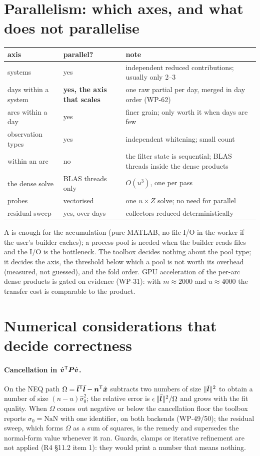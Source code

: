 \section{Parallelism: which axes, and what does not parallelise}
\label{sec:parallel}

\begin{tabular}{@{}P{30mm}P{34mm}P{92mm}@{}}
\toprule
axis & parallel? & note\\
\midrule
systems & yes & independent reduced contributions; usually only 2--3\\
days within a system & \textbf{yes, the axis that scales} & one raw partial per day, merged in day order (WP-62)\\
arcs within a day & yes & finer grain; only worth it when days are few\\
observation types & yes & independent whitening; small count\\
within an arc & no & the filter state is sequential; BLAS threads inside the dense products\\
the dense solve & BLAS threads only & $O(u^3)$, one per pass\\
probes & vectorised & one $u\times Z$ solve; no need for parallel\\
residual sweep & yes, over days & collectors reduced deterministically\\
\bottomrule
\end{tabular}

A  is enough for the accumulation (pure MATLAB, no file I/O in the worker if the user's builder caches); a process pool is needed when the builder reads files and the I/O is the bottleneck. The toolbox decides nothing about the pool type; it decides the axis, the threshold below which a pool is not worth its overhead (measured, not guessed), and the fold order. GPU acceleration of the per-arc dense products is gated on evidence (WP-31): with $m\approx 2000$ and $u\approx 4000$ the transfer cost is comparable to the product.

\section{Numerical considerations that decide correctness}
\label{sec:cancellation}

\paragraph{Cancellation in $\hat{\bm{v}}^{\mathsf T}\bm{P}\hat{\bm{v}}$.} On the NEQ path $\Omega = \bar{\bm{l}}^{\mathsf T}\bar{\bm{l}} - \bm{n}^{\mathsf T}\hat{\bm{x}}$ subtracts two numbers of size $\|\bar{\bm{l}}\|^2$ to obtain a number of size $(n-u)\hat\sigma_0^2$; the relative error is $\epsilon\,\|\bar{\bm{l}}\|^2/\Omega$ and grows with the fit quality. When $\Omega$ comes out negative or below the cancellation floor the toolbox reports $\hat\sigma_0 = \mathrm{NaN}$ with one identifier, on both backends (WP-49/50); the residual sweep, which forms $\Omega$ as a sum of squares, is the remedy and supersedes the normal-form value whenever it ran. Guards, clamps or iterative refinement are not applied (R4 §11.2 item 1): they would print a number that means nothing.

